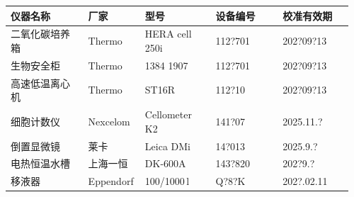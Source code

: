 \documentclass[UTF8,10pt,a4paper,fontset=fandol]{ctexart}
\newcommand{\fieldvalue}[1]{#1}
\newcommand{\handwritten}[1]{#1}
\begin{document}
\begin{tabular}{|p{0.22\linewidth}|p{0.15\linewidth}|p{0.20\linewidth}|p{0.19\linewidth}|p{0.20\linewidth}|}
\hline
仪器名称 & 厂家 & 型号 & 设备编号 & 校准有效期\\
\hline
二氧化碳培养箱 & Thermo & HERA cell 250i &
\fieldvalue{\handwritten{112?701}} &
\fieldvalue{\handwritten{202?09?13}}\\
\hline
生物安全柜 & Thermo &
\fieldvalue{\handwritten{1384 1907}} &
\fieldvalue{\handwritten{112?701}} &
\fieldvalue{\handwritten{202?09?13}}\\
\hline
高速低温离心机 & Thermo & ST16R &
\fieldvalue{\handwritten{112?10}} &
\fieldvalue{\handwritten{202?09?13}}\\
\hline
细胞计数仪 & Nexcelom & Cellometer K2 &
\fieldvalue{\handwritten{141?07}} &
\fieldvalue{\handwritten{2025.11.?}}\\
\hline
倒置显微镜 & 莱卡 & Leica DMi &
\fieldvalue{\handwritten{14?013}} &
\fieldvalue{\handwritten{2025.9.?}}\\
\hline
电热恒温水槽 & 上海一恒 &
\fieldvalue{\handwritten{DK-600A}} &
\fieldvalue{\handwritten{143?820}} &
\fieldvalue{\handwritten{202?9.?}}\\
\hline
\multirow{1}{*}{移液器} & \multirow{1}{*}{Eppendorf} &
\fieldvalue{\handwritten{100/1000\,\mu l}} &
\fieldvalue{\handwritten{Q?8?K}} &
\fieldvalue{\handwritten{202?.02.11}}\\
\hline
\end{tabular}
\end{document}
